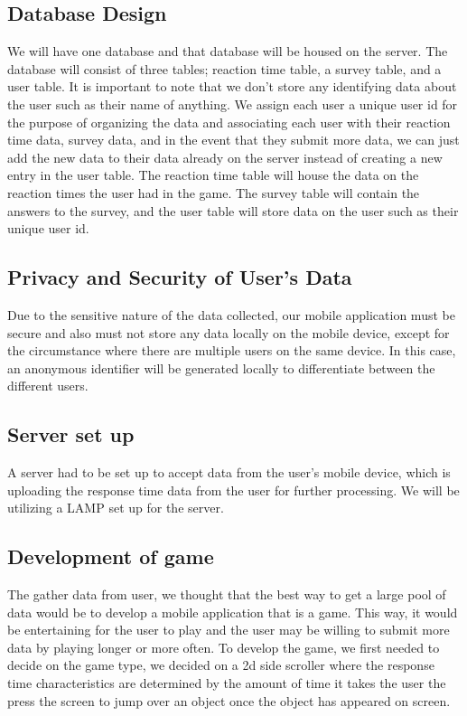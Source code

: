 \documentclass[a4wide]{article}
\begin{document}
\subsection{Database Design}
\- We will have one database and that database will be housed on the server. The database will consist of three tables; reaction time table, a survey table, and a user table. It is important to note that we don't store any identifying data about the user such as their name of anything. We assign each user a unique user id for the purpose of organizing the data and associating each user with their reaction time data, survey data, and in the event that they submit more data, we can just add the new data to their data already on the server instead of creating a new entry in the user table. The reaction time table will house the data on the reaction times the user had in the game. The survey table will contain the answers to the survey, and the user table will store data on the user such as their unique user id.
\subsection{Privacy and Security of User's Data}
\- Due to the sensitive nature of the data collected, our mobile application must be secure and also must not store any data locally on the mobile device, except for the circumstance where there are multiple users on the same device. In this case, an anonymous identifier will be generated locally to differentiate between the different users. 
\subsection{Server set up}
\- A server had to be set up to accept data from the user's mobile device, which is uploading the response time data from the user for further processing. We will be utilizing a LAMP set up for the server.
\subsection{Development of game}
\- The gather data from user, we thought that the best way to get a large pool of data would be to develop a mobile application that is a game. This way, it would be entertaining for the user to play and the user may be willing to submit more data by playing longer or more often. To develop the game, we first needed to decide on the game type, we decided on a 2d side scroller where the response time characteristics are determined by the amount of time it takes the user the press the screen to jump over an object once the object has appeared on screen. 
\end{document}
